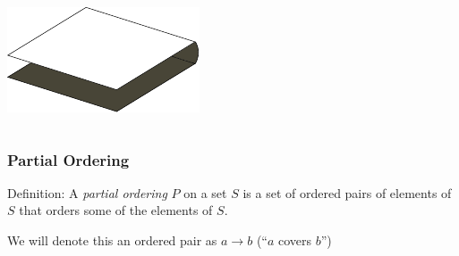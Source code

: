 \documentclass{beamer}
\begin{document}
\begin{frame}
\begin{columns}[c]
\includegraphics[width=.9\textwidth]{sam_images/checkerboard-3d.pdf}

\end{columns}

\end{frame}



\begin{frame}
\frametitle{Partial Ordering}
\begin{block}{Definition:}
A \textit{partial ordering} $P$ on a set $S$ is a set of ordered pairs of elements of $S$ that orders some of the elements of $S$.
\end{block}

\bigskip
\bigskip
\bigskip

\pause

We will denote this an ordered pair as $a \rightarrow b$  (``$a$ covers $b$'')

\end{frame}

\end{document}
